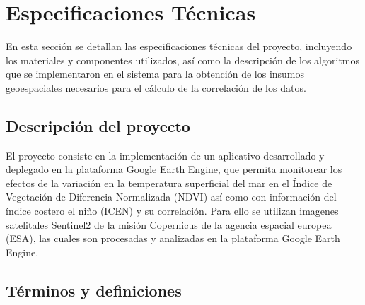 \section{Especificaciones Técnicas }

  En esta sección se detallan las especificaciones técnicas del proyecto, incluyendo los materiales y componentes utilizados, así como la descripción de los algoritmos que se implementaron en el sistema para la obtención de los insumos geoespaciales necesarios para el cálculo de la correlación de los datos.

  \subsection{Descripción del proyecto}

    El proyecto consiste en la implementación de un aplicativo desarrollado y deplegado en la plataforma Google Earth Engine, que permita monitorear los efectos de la variación en la temperatura superficial del mar en el Índice de Vegetación de Diferencia Normalizada (NDVI) así como con información del índice costero el niño (ICEN) y su correlación. Para ello se utilizan imagenes satelitales Sentinel2 de la misión Copernicus de la agencia espacial europea (ESA), las cuales son procesadas y analizadas en la plataforma Google Earth Engine.

  \subsection{Términos y definiciones}

